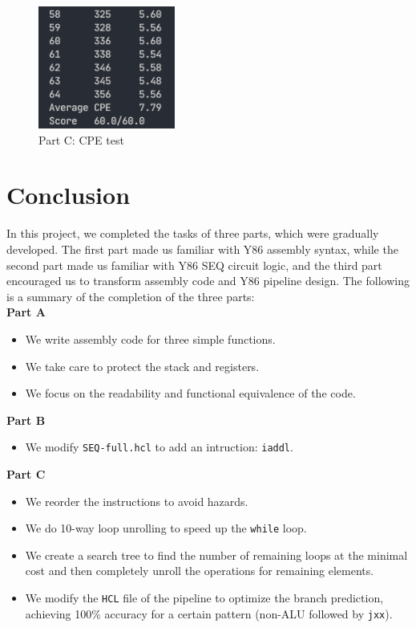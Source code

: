 \documentclass[12pt,a4paper]{article}
\begin{document}
\begin{figure}[H] %
        \centering %
        \includegraphics[width=0.4\textwidth]{partC-CPE-test.png} %
        \caption{Part C: CPE test} %
        \label{Fig.partC-CPE} %
\end{figure}
\pagebreak
\section{Conclusion}
In this project, we completed the tasks of three parts, which were gradually developed. The first part made us familiar with Y86 assembly syntax, while the second part made us familiar with Y86 SEQ circuit logic, and the third part encouraged us to transform assembly code and Y86 pipeline design.
The following is a summary of the completion of the three parts:\\
\textbf{Part A}
\begin{itemize}
        \item We write assembly code for three simple functions.
        \item We take care to protect the stack and registers.
        \item We focus on the readability and functional equivalence of the code.
\end{itemize}
\textbf{Part B}
\begin{itemize}
        \item We modify \texttt{SEQ-full.hcl} to add an intruction: \texttt{iaddl}.
\end{itemize}
\textbf{Part C}
\begin{itemize}
        \item We reorder the instructions to avoid hazards.
        \item We do 10-way loop unrolling to speed up the \texttt{while} loop.
        \item We create a search tree to find the number of remaining loops at the minimal cost and then completely unroll the operations for remaining elements.
        \item We modify the \texttt{HCL} file of the pipeline to optimize the branch prediction,  achieving 100\% accuracy for a certain pattern (non-ALU followed by \texttt{jxx}).
\end{itemize}
\end{document}
